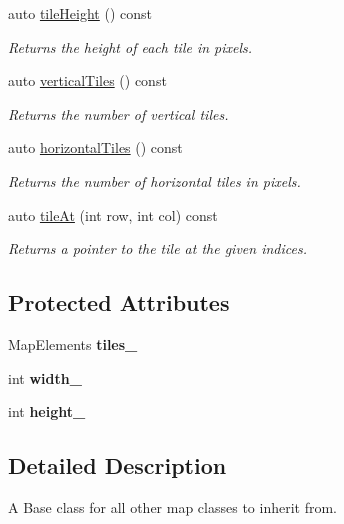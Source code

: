 \begin{DoxyCompactItemize}
auto \mbox{\hyperlink{classMap_ac722cf9e28d26a31155b505b42aa439f}{tile\+Height}} () const
\begin{DoxyCompactList}\small\item\em Returns the height of each tile in pixels. \end{DoxyCompactList}\item 
auto \mbox{\hyperlink{classMap_a144dfbc2a51f8337b02831fa77b1d51f}{vertical\+Tiles}} () const
\begin{DoxyCompactList}\small\item\em Returns the number of vertical tiles. \end{DoxyCompactList}\item 
auto \mbox{\hyperlink{classMap_ae03349d7594b92d943b52fe5de3864a9}{horizontal\+Tiles}} () const
\begin{DoxyCompactList}\small\item\em Returns the number of horizontal tiles in pixels. \end{DoxyCompactList}\item 
auto \mbox{\hyperlink{classMap_a901031825f0a02cfc888e6748c47d672}{tile\+At}} (int row, int col) const
\begin{DoxyCompactList}\small\item\em Returns a pointer to the tile at the given indices. \end{DoxyCompactList}\end{DoxyCompactItemize}
\subsection*{Protected Attributes}
\begin{DoxyCompactItemize}
\item 
\mbox{\label{classMap_ab134971f0ca070bcf982391c5de2d913}} 
Map\+Elements {\bfseries tiles\+\_\+}
\item 
\mbox{\label{classMap_a6c90432856cd75ce1e19c4138caf82e7}} 
int {\bfseries width\+\_\+}
\item 
\mbox{\label{classMap_ad8bd63d7d81e3513726c55a1682afc52}} 
int {\bfseries height\+\_\+}
\end{DoxyCompactItemize}


\subsection{Detailed Description}
A Base class for all other map classes to inherit from. 



